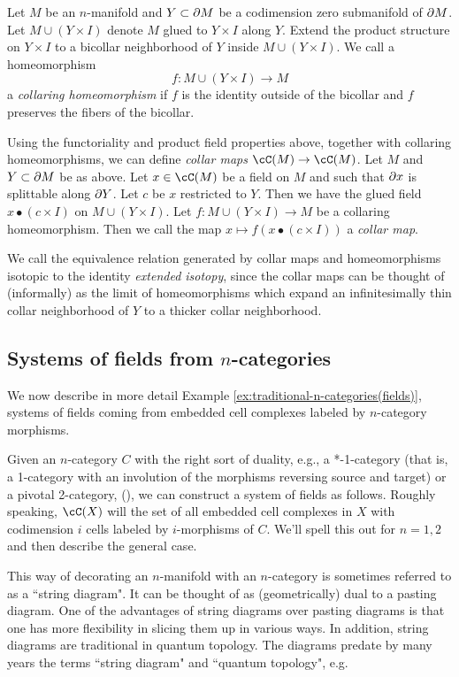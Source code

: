 \medskip


Let $M$ be an $n$-manifold and $Y \subset \partial M$ be a codimension zero submanifold
of $\partial M$.
Let $M \cup (Y\times I)$ denote $M$ glued to $Y\times I$ along $Y$.
Extend the product structure on $Y\times I$ to a bicollar neighborhood of 
$Y$ inside $M \cup (Y\times I)$.
We call a homeomorphism
\[
	f: M \cup (Y\times I) \to M
\]
a {\it collaring homeomorphism} if $f$ is the identity outside of the bicollar
and $f$ preserves the fibers of the bicollar.

Using the functoriality and product field properties above, together
with collaring homeomorphisms, we can define 
{\it collar maps} $\cC(M)\to \cC(M)$.
Let $M$ and $Y \subset \partial M$ be as above.
Let $x \in \cC(M)$ be a field on $M$ and such that $\partial x$ is splittable along $\partial Y$.
Let $c$ be $x$ restricted to $Y$.
Then we have the glued field $x \bullet (c\times I)$ on $M \cup (Y\times I)$.
Let $f: M \cup (Y\times I) \to M$ be a collaring homeomorphism.
Then we call the map $x \mapsto f(x \bullet (c\times I))$ a {\it collar map}.

We call the equivalence relation generated by collar maps and
homeomorphisms isotopic to the identity {\it extended isotopy}, since the collar maps
can be thought of (informally) as the limit of homeomorphisms
which expand an infinitesimally thin collar neighborhood of $Y$ to a thicker
collar neighborhood.




\subsection{Systems of fields from \texorpdfstring{$n$}{n}-categories}
\label{sec:example:traditional-n-categories(fields)}
We now describe in more detail Example \ref{ex:traditional-n-categories(fields)}, 
systems of fields coming from embedded cell complexes labeled
by $n$-category morphisms.

Given an $n$-category $C$ with the right sort of duality,
e.g., a *-1-category (that is, a 1-category with an involution of the morphisms
reversing source and target) or a pivotal 2-category,
(\cite{MR1686423, 0908.3347,1009.0186}),
we can construct a system of fields as follows.
Roughly speaking, $\cC(X)$ will the set of all embedded cell complexes in $X$
with codimension $i$ cells labeled by $i$-morphisms of $C$.
We'll spell this out for $n=1,2$ and then describe the general case.

This way of decorating an $n$-manifold with an $n$-category is sometimes referred to
as a ``string diagram".
It can be thought of as (geometrically) dual to a pasting diagram.
One of the advantages of string diagrams over pasting diagrams is that one has more
flexibility in slicing them up in various ways.
In addition, string diagrams are traditional in quantum topology.
The diagrams predate by many years the terms ``string diagram" and 
``quantum topology", e.g. \cite{MR0281657,MR776784} %


